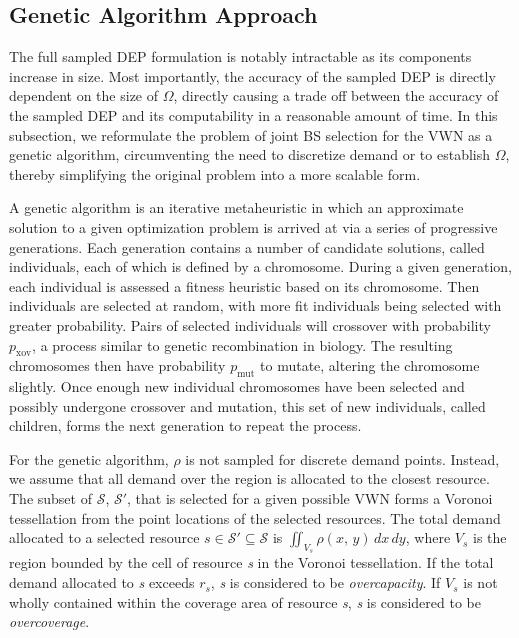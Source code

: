 \documentclass[onecolumn,draftcls]{IEEEtran}
\begin{document}

\subsection{Genetic Algorithm Approach} \label{subsec:ga}
The full sampled DEP formulation is notably intractable as its components increase in size.  Most importantly, the accuracy of the sampled DEP is directly dependent on the size of $\Omega$, directly causing a trade off between the accuracy of the sampled DEP and its computability in a reasonable amount of time.  In this subsection, we reformulate the problem of joint BS selection for the VWN as a genetic algorithm, circumventing the need to discretize demand or to establish $\Omega$, thereby simplifying the original problem into a more scalable form.

A genetic algorithm is an iterative metaheuristic in which an approximate solution to a given optimization problem is arrived at via a series of progressive generations.  Each generation contains a number of candidate solutions, called individuals, each of which is defined by a chromosome.  During a given generation, each individual is assessed a fitness heuristic based on its chromosome.  Then individuals are selected at random, with more fit individuals being selected with greater probability.  Pairs of selected individuals will crossover with probability $p_\text{xov}$, a process similar to genetic recombination in biology.  The resulting chromosomes then have probability $p_\text{mut}$ to mutate, altering the chromosome slightly.  Once enough new individual chromosomes have been selected and possibly undergone crossover and mutation, this set of new individuals, called children, forms the next generation to repeat the process.  %

For the genetic algorithm, $\rho$ is not sampled for discrete demand points.  Instead, we assume that all demand over the region is allocated to the closest resource.  The subset of $\mathcal{S}$, $\mathcal{S}'$, that is selected for a given possible VWN forms a Voronoi tessellation from the point locations of the selected resources.  The total demand allocated to a selected resource $s \in \mathcal{S}' \subseteq \mathcal{S}$ is $\iint_{V_s} \rho\left(x,\, y\right) \,dx \,dy$, where $V_s$ is the region bounded by the cell of resource \textit{s} in the Voronoi tessellation.  If the total demand allocated to \textit{s} exceeds $r_s$, \textit{s} is considered to be \textit{overcapacity}.  If $V_s$ is not wholly contained within the coverage area of resource \textit{s}, \textit{s} is considered to be \textit{overcoverage}.
\end{document}

